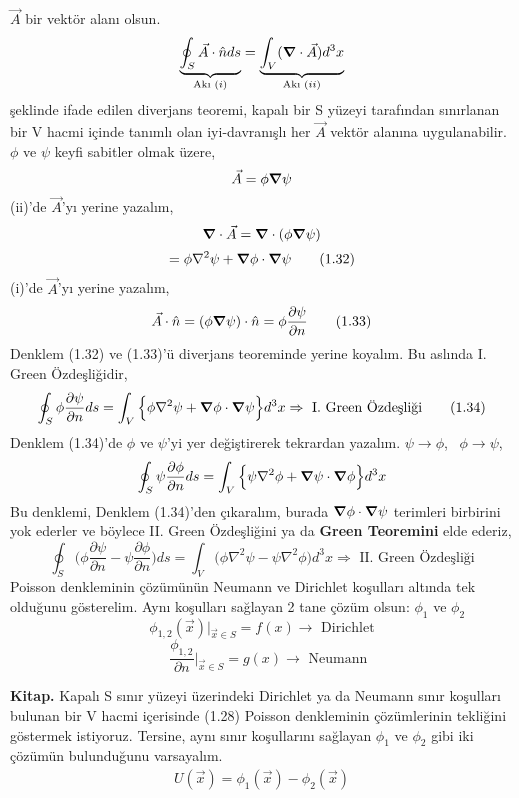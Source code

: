 \begin{theorem}
$\Vec{A}$ bir vektör alanı olsun.
\[ \underbrace{\oint_{S} \Vec{A} \cdot \hat{n} ds}_{\textrm{Akı } (i)} = \underbrace{\int_{V} (\grad \cdot \Vec{A}) d^{3}x}_{\textrm{Akı } (ii)} \]
şeklinde ifade edilen diverjans teoremi, kapalı bir S yüzeyi tarafından sınırlanan bir V hacmi içinde tanımlı olan iyi-davranışlı her $\Vec{A}$ vektör alanına uygulanabilir. $\phi$ ve $\psi$ keyfi sabitler olmak üzere,
\[ \Vec{A} = \phi \grad \psi \]
(ii)'de $\Vec{A}$'yı yerine yazalım,
\[ \grad \cdot \Vec{A} = \grad \cdot (\phi \grad \psi) \]
\[ = \phi \nabla^{2} \psi + \grad \phi \cdot \grad \psi \tag{1.32} \]
(i)'de $\Vec{A}$'yı yerine yazalım,
\[ \Vec{A} \cdot \hat{n} = (\phi \grad \psi) \cdot \hat{n} = \phi \dfrac{\partial \psi}{\partial n} \tag{1.33} \]
Denklem (1.32) ve (1.33)'ü diverjans teoreminde yerine koyalım. Bu aslında I. Green Özdeşliğidir,
\[ \oint_{S} \phi \dfrac{\partial \psi}{\partial n} ds = \int_{V} \Big\{ \phi \nabla^{2} \psi + \grad \phi \cdot \grad \psi \Big\} d^{3}x  \Rightarrow \textrm{ I. Green Özdeşliği} \tag{1.34}\]
Denklem (1.34)'de $\phi$ ve $\psi$'yi yer değiştirerek tekrardan yazalım. $\psi \rightarrow \phi$, \ $\phi \rightarrow \psi$,
\[ \oint_{S} \psi \dfrac{\partial \phi}{\partial n} ds = \int_{V} \Big\{ \psi \nabla^{2} \phi + \grad \psi \cdot \grad \phi \Big\} d^{3}x \]
Bu denklemi, Denklem (1.34)'den çıkaralım, burada $\grad \phi \cdot \grad \psi$ terimleri birbirini yok ederler ve böylece II. Green Özdeşliğini ya da \textbf{Green Teoremini} elde ederiz,
\[ \oint_{S} \bigg( \phi  \dfrac{\partial \psi}{\partial n} - \psi  \dfrac{\partial \phi}{\partial n} \bigg) ds = \int_{V} \bigg(  \phi \nabla^{2} \psi  - \psi \nabla^{2} \phi \bigg) d^{3}x  \Rightarrow \textrm{ II. Green Özdeşliği} \tag{1.35}\]
Poisson denkleminin çözümünün Neumann ve Dirichlet koşulları altında tek olduğunu gösterelim. Aynı koşulları sağlayan 2 tane çözüm olsun: $\phi_{1}$ ve $\phi_{2}$
\[ \phi_{1,2} (\Vec{x})  \Bigg|_{\Vec{x} \in S} = f(x) \rightarrow \textrm{ Dirichlet}  \]
\[ \ \ \ \ \dfrac{\phi_{1,2}}{\partial n}  \Bigg|_{\Vec{x} \in S} = g(x) \rightarrow \textrm{ Neumann}  \]
\begin{tcolorbox}
\textbf{Kitap.} Kapalı S sınır yüzeyi üzerindeki Dirichlet ya da Neumann sınır koşulları bulunan bir V hacmi içerisinde (1.28) Poisson denkleminin çözümlerinin tekliğini göstermek istiyoruz. Tersine, aynı sınır koşullarını sağlayan $\phi_{1}$ ve $\phi_{2}$ gibi iki çözümün bulunduğunu varsayalım.
\begin{align*}
 U(\Vec{x}) = \phi_{1} (\Vec{x}) - \phi_{2} (\Vec{x}) \tag{1.37}    
\end{align*} 

\end{tcolorbox}
\end{theorem}
